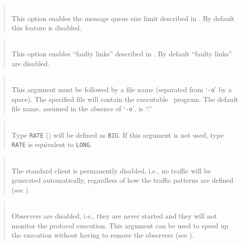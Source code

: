 \begin{quote}
\noindent{}\\ \hspace{0in}
This option enables the message queue size limit described in
.
By default this feature is disabled.
\end{quote}

\begin{quote}
\noindent{}\\ \hspace{0in}
This option enables ``faulty links'' described in .
By default ``faulty links'' are disabled.
\end{quote}

\begin{quote}
\noindent{}\\ \hspace{0in}
This argument must be followed by a file name (separated from `{\tt -o}' by
a space).
The specified file will contain the executable \smurph\ program.
The default file name, assumed in the absence of `{\tt -o}',
is ``\smurphtts.''
\end{quote}

\begin{quote}
\noindent{}\\ \hspace{0in}
Type {\tt RATE} () will be defined as {\tt BIG}.
If this argument is not used, type {\tt RATE} is equivalent to {\tt LONG}.
\end{quote}

\begin{quote}
\noindent{}\\ \hspace{0in}
The standard client is permanently disabled, i.e., no traffic will be
generated automatically, regardless of how the traffic patterns are
defined (see ).
\end{quote}

\begin{quote}
\noindent{}\\ \hspace{0in}
Observers are disabled, i.e., they are never started and they will not
monitor the protocol execution.
This argument can be used to speed up the execution without having
to remove the observers (see ).
\end{quote}

